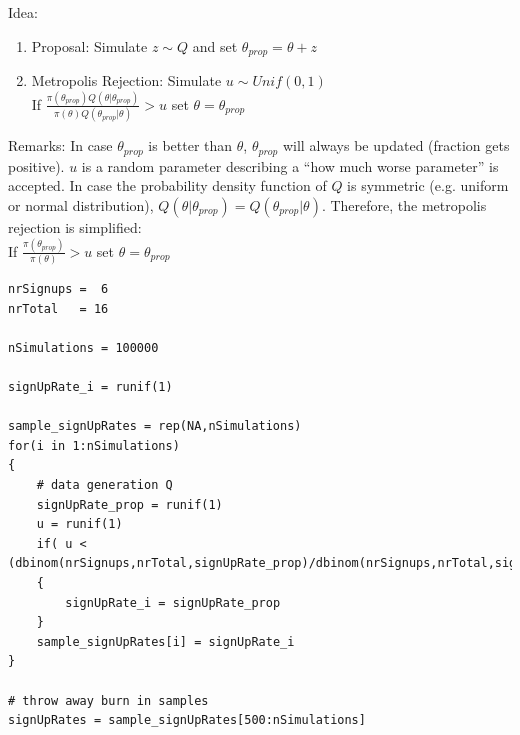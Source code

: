 Idea:
\begin{enumerate}
	\tightlist
	\item Proposal: Simulate $z\sim Q$ and set $\theta_{prop} = \theta + z$
	\item Metropolis Rejection: Simulate $u\sim Unif(0, 1)$\\
	If $\frac{\pi(\theta_{prop})Q(\theta|\theta_{prop})}{\pi(\theta)Q(\theta_{prop}|\theta)}>u$ set $\theta = \theta_{prop}$
\end{enumerate}
Remarks: In case $\theta_{prop}$ is better than $\theta$,  $\theta_{prop}$ will always be updated (fraction gets positive). $u$ is a random parameter describing a ``how much worse parameter'' is accepted. In case the probability density function of $Q$ is symmetric (e.g. uniform or normal distribution), $Q(\theta|\theta_{prop}) = Q(\theta_{prop}|\theta)$. Therefore, the metropolis rejection is simplified:\\
If $\frac{\pi(\theta_{prop})}{\pi(\theta)}>u$ set $\theta = \theta_{prop}$
\begin{lstlisting}
nrSignups =  6
nrTotal   = 16

nSimulations = 100000

signUpRate_i = runif(1)

sample_signUpRates = rep(NA,nSimulations)
for(i in 1:nSimulations)
{
	# data generation Q
	signUpRate_prop = runif(1)
	u = runif(1)
	if( u < (dbinom(nrSignups,nrTotal,signUpRate_prop)/dbinom(nrSignups,nrTotal,signUpRate_i)))
	{
		signUpRate_i = signUpRate_prop
	}
	sample_signUpRates[i] = signUpRate_i
}

# throw away burn in samples
signUpRates = sample_signUpRates[500:nSimulations]
\end{lstlisting}
